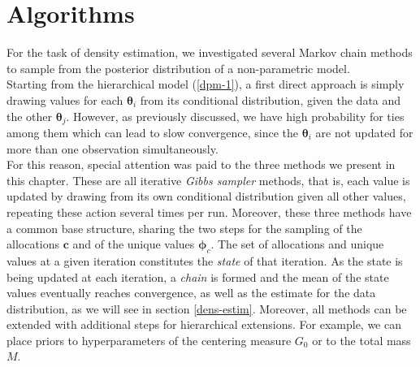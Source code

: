 \chapter{Algorithms} \label{algo}
For the task of density estimation, we investigated several Markov chain methods to sample from the posterior distribution of a non-parametric model. \\
Starting from the hierarchical model (\ref{dpm-1}), a first direct approach is simply drawing values for each $\boldsymbol\theta_i$ from its conditional distribution, given the data and the other $\boldsymbol\theta_j$.
However, as previously discussed, we have high probability for ties among them which can lead to slow convergence, since the $\boldsymbol\theta_i$ are not updated for more than one observation simultaneously. \\
For this reason, special attention was paid to the three methods we present in this chapter.
These are all iterative \emph{Gibbs sampler} methods, that is, each value is updated by drawing from its own conditional distribution given all other values, repeating these action several times per run.
Moreover, these three methods have a common base structure, sharing the two steps for the sampling of the allocations $\mathbf{c}$ and of the unique values $\boldsymbol\phi_c$.
The set of allocations and unique values at a given iteration constitutes the \emph{state} of that iteration.
As the state is being updated at each iteration, a \emph{chain} is formed and the mean of the state values eventually reaches convergence, as well as the estimate for the data distribution, as we will see in section \ref{dens-estim}.
Moreover, all methods can be extended with additional steps for hierarchical extensions.
For example, we can place priors to hyperparameters of the centering measure $G_0$ or to the total mass $M$.

